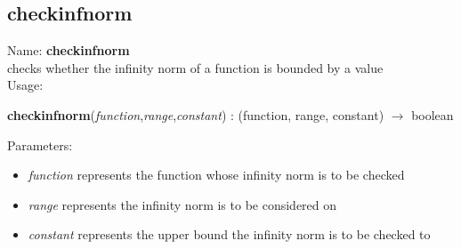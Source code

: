 \subsection{checkinfnorm}
\label{labcheckinfnorm}
\noindent Name: \textbf{checkinfnorm}\\
checks whether the infinity norm of a function is bounded by a value\\
\noindent Usage: 
\begin{center}
\textbf{checkinfnorm}(\emph{function},\emph{range},\emph{constant}) : (\textsf{function}, \textsf{range}, \textsf{constant}) $\rightarrow$ \textsf{boolean}\\
\end{center}
Parameters: 
\begin{itemize}
\item \emph{function} represents the function whose infinity norm is to be checked
\item \emph{range} represents the infinity norm is to be considered on
\item \emph{constant} represents the upper bound the infinity norm is to be checked to
\end{itemize}
